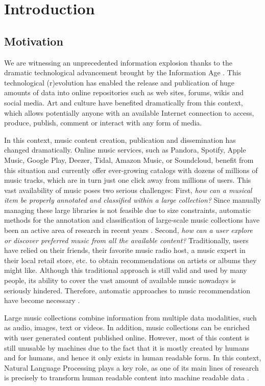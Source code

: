 
\chapter{Introduction}
\label{sec:intro}

\section{Motivation}
\label{sec:intro:motivation}

We are witnessing an unprecedented information explosion thanks to the dramatic technological advancement brought by the Information Age \citep{smith2009social}. This technological (r)evolution has enabled the release and publication of huge amounts of data into online repositories such as web sites, forums, wikis and social media. Art and culture have benefited dramatically from this context, which allows potentially anyone with an available Internet connection to access, produce, publish, comment or interact with any form of media. 

In this context, music content creation, publication and dissemination has changed dramatically. Online music services, such as Pandora, Spotify, Apple Music, Google Play, Deezer, Tidal, Amazon Music, or Soundcloud, benefit from this situation and currently offer ever-growing catalogs with dozens of millions of music tracks, which are in turn just one click away from millions of users. This vast availability of music poses two serious challenges: First, \textit{how can a musical item be properly annotated and classified within a large collection?} Since manually managing these large libraries is not feasible due to size constraints, automatic methods for the annotation and classification of large-scale music collections have been an active area of research in recent years \citep{Schedl2014}. Second, \textit{how can a user explore or discover preferred music from all the available content?} Traditionally, users have relied on their friends, their favorite music radio host, a music expert in their local retail store, etc. to obtain recommendations on artists or albums they might like. Although this traditional approach is still valid and used by many people, its ability to cover the vast amount of available music nowadays is seriously hindered. Therefore, automatic approaches to music recommendation have become necessary \citep{celma2008new}.

Large music collections combine information from multiple data modalities, such as audio, images, text or videos. In addition, music collections can be enriched with user generated content published online. However, most of this content is still unusable by machines due to the fact that it is mostly created by humans and for humans, and hence it only exists in human readable form. In this context, Natural Language Processing plays a key role, as one of its main lines of research is precisely to transform human readable content into machine readable data \citep{cowie1996information}. %

